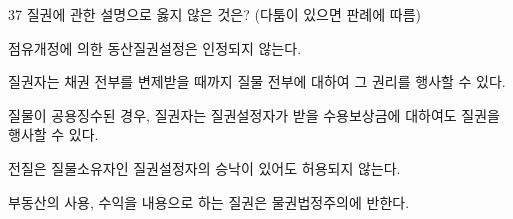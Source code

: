 \begin{question}{37}
질권에 관한 설명으로 옳지 않은 것은? (다툼이 있으면 판례에 따름)
\begin{choices}
  \item 점유개정에 의한 동산질권설정은 인정되지 않는다.
  \item 질권자는 채권 전부를 변제받을 때까지 질물 전부에 대하여 그 권리를 행사할 수 있다.
  \item 질물이 공용징수된 경우, 질권자는 질권설정자가 받을 수용보상금에 대하여도 질권을 행사할 수 있다.
  \item 전질은 질물소유자인 질권설정자의 승낙이 있어도 허용되지 않는다.
  \item 부동산의 사용, 수익을 내용으로 하는 질권은 물권법정주의에 반한다.
\end{choices}
\end{question}
